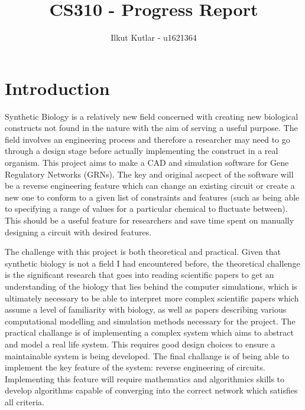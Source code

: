 \documentclass{article}
\author{Ilkut Kutlar - u1621364}
\title{CS310 - Progress Report}
\begin{document}
	\maketitle
	\tableofcontents
	
	\newpage
	
	\section{Introduction}
	
	Synthetic Biology is a relatively new field concerned with creating new biological constructs not found in the nature with the aim of serving a useful purpose. The field involves an engineering process and therefore a researcher may need to go through a design stage before actually implementing the construct in a real organism. This project aims to make a CAD and simulation software for Gene Regulatory Networks (GRNs). The key and original ascpect of the software will be a reverse engineering feature which can change an existing circuit or create a new one to conform to a given list of constraints and features (such as being able to specifying a range of values for a particular chemical to fluctuate between). This should be a useful feature for researchers and save time spent on manually designing a circuit with desired features.
	
	
	The challenge with this project is both theoretical and practical. Given that synthetic biology is not a field 
	I had encountered before, the theoretical challenge is the significant research that goes into reading scientific papers to get an understanding of the biology that lies behind the computer simulations, which is ultimately necessary to be able to interpret more complex scientific papers which assume a level of familiarity with biology, as well as papers describing various computational modelling and simulation methods necessary for the project. The practical challange is of implementing a complex system which aims to abstract and model a real life system. This requires good design choices to ensure a maintainable system is being developed. The final challange is of being able to implement the key feature of the system: reverse engineering of circuits. Implementing this feature will require mathematics and algorithmics skills to develop algorithms capable of converging into the correct network which satisfies all criteria.
	
\end{document}
